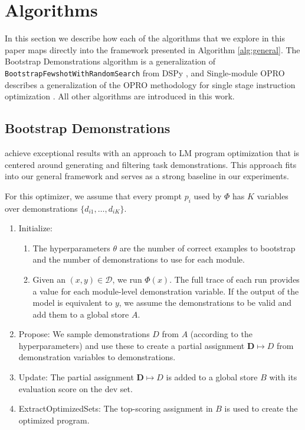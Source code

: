 \newpage

\section{Algorithms}
\label{sec:algo_appendix}

In this section we describe how each of the algorithms that we explore in this paper maps directly into the framework presented in Algorithm \ref{alg:general}.  The Bootstrap Demonstrations algorithm is a generalization of \texttt{BootstrapFewshotWithRandomSearch} from DSPy \citep{khattab2024dspy}, and Single-module OPRO describes a generalization of the OPRO methodology for single stage instruction optimization \citep{yang2023large}.  All other algorithms are introduced in this work.

\subsection{Bootstrap Demonstrations}

\citet{khattab2024dspy} achieve exceptional results with an approach to LM program optimization that is centered around generating and filtering task demonstrations. This approach fits into our general framework and serves as a strong baseline in our experiments.

For this optimizer, we assume that every prompt $p_{i}$ used by $\Phi$ has $K$ variables over demonstrations $\{d_{i1},\ldots,d_{iK}\}$.
\begin{enumerate}
\item Initialize: 
\begin{enumerate}
\item The hyperparameters $\theta$ are the number of correct examples to bootstrap and the number of demonstrations to use for each module.
\item Given an $(x, y) \in \mathcal{D}$, we run $\Phi(x)$. The full trace of each run provides a value for each module-level demonstration variable. If the output of the model is equivalent to $y$, we assume the demonstrations to be valid and add them to a global store $A$.
\end{enumerate}
\item Propose: We sample demonstrations $D$ from $A$ (according to the hyperparameters) and use these to create a partial assignment $\mathbf{D}\mapsto D$ from demonstration variables to demonstrations.
\item Update: The partial assignment $\mathbf{D}\mapsto D$ is added to a global store $B$ with its evaluation score on the dev set.
\item ExtractOptimizedSets: The top-scoring assignment in $B$ is used to create the optimized program.
\end{enumerate}

